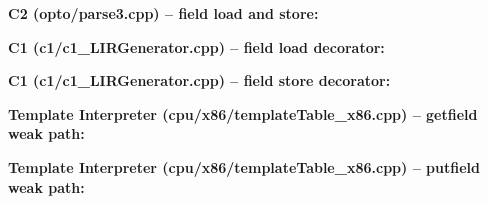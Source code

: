 \medskip
\noindent\textbf{C2 (opto/parse3.cpp) -- field load and store:}



\medskip
\noindent\textbf{C1 (c1/c1\_LIRGenerator.cpp) -- field load decorator:}



\medskip
\noindent\textbf{C1 (c1/c1\_LIRGenerator.cpp) -- field store decorator:}



\medskip
\noindent\textbf{Template Interpreter (cpu/x86/templateTable\_x86.cpp) -- getfield weak path:}



\medskip
\noindent\textbf{Template Interpreter (cpu/x86/templateTable\_x86.cpp) -- putfield weak path:}



